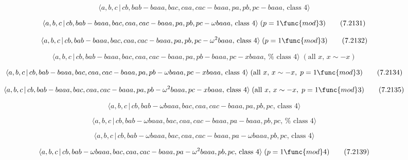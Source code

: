 \documentclass[10pt]{article}
\begin{document}
\begin{equation}
\langle a,b,c\,|\,cb,bab-baaa,bac,caa,cac-baaa,pa,pb,pc-baaa,\,\text{class }%
4\rangle  \tag{7.2130}
\end{equation}

\begin{equation}
\langle a,b,c\,|\,cb,bab-baaa,bac,caa,cac-baaa,pa,pb,pc-\omega baaa,\,\text{%
class }4\rangle \;(p=1\func{mod}3)  \tag{7.2131}
\end{equation}

\begin{equation}
\langle a,b,c\,|\,cb,bab-baaa,bac,caa,cac-baaa,pa,pb,pc-\omega ^{2}baaa,\,%
\text{class }4\rangle \;(p=1\func{mod}3)  \tag{7.2132}
\end{equation}

\begin{equation}
\langle a,b,c\,|\,cb,bab-baaa,bac,caa,cac-baaa,pa,pb-baaa,pc-xbaaa,\,\text{%
class }4\rangle \;(\text{all }x,\,x\sim -x)  \tag{7.2133}
\end{equation}

\begin{equation}
\langle a,b,c\,|\,cb,bab-baaa,bac,caa,cac-baaa,pa,pb-\omega baaa,pc-xbaaa,\,%
\text{class }4\rangle \;(\text{all }x,\,x\sim -x,\;p=1\func{mod}3) 
\tag{7.2134}
\end{equation}

\begin{equation}
\langle a,b,c\,|\,cb,bab-baaa,bac,caa,cac-baaa,pa,pb-\omega
^{2}baaa,pc-xbaaa,\,\text{class }4\rangle \;(\text{all }x,\,x\sim -x,\;p=1%
\func{mod}3)  \tag{7.2135}
\end{equation}

\begin{equation}
\langle a,b,c\,|\,cb,bab-\omega baaa,bac,caa,cac-baaa,pa,pb,pc,\,\text{class 
}4\rangle  \tag{7.2136}
\end{equation}

\begin{equation}
\langle a,b,c\,|\,cb,bab-\omega baaa,bac,caa,cac-baaa,pa-baaa,pb,pc,\,\text{%
class }4\rangle  \tag{7.2137}
\end{equation}

\begin{equation}
\langle a,b,c\,|\,cb,bab-\omega baaa,bac,caa,cac-baaa,pa-\omega baaa,pb,pc,\,%
\text{class }4\rangle  \tag{7.2138}
\end{equation}

\begin{equation}
\langle a,b,c\,|\,cb,bab-\omega baaa,bac,caa,cac-baaa,pa-\omega
^{2}baaa,pb,pc,\,\text{class }4\rangle \;(p=1\func{mod}4)  \tag{7.2139}
\end{equation}
\end{document}
